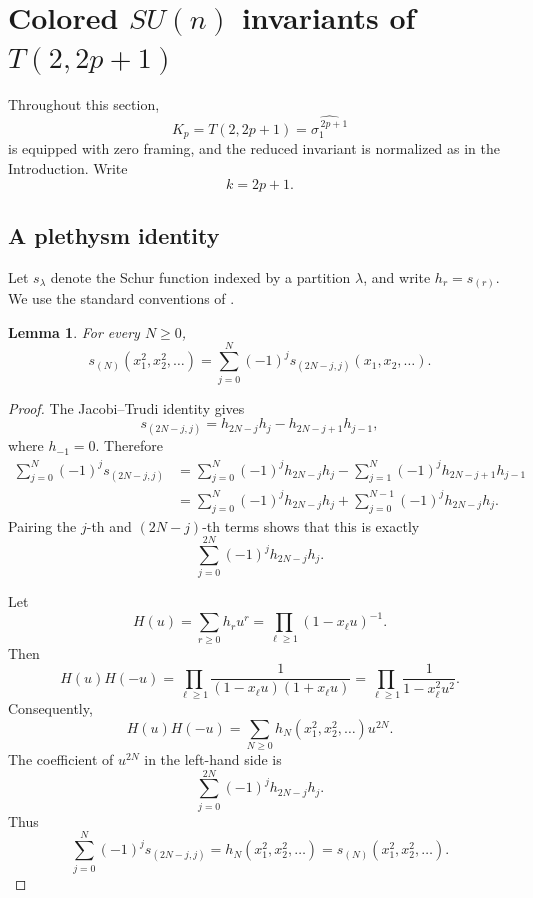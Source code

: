 \documentclass[11pt]{amsart}
\newtheorem{lemma}[theorem]{Lemma}
\begin{document}
\section{Colored \(SU(n)\) invariants of \(T(2,2p+1)\)}
\label{sec:torus}


Throughout this section,
\[
K_p=T(2,2p+1)=\widehat{\sigma_1^{\,2p+1}}
\]
is equipped with zero framing, and the reduced invariant is normalized
as in the Introduction.  Write
\[
k=2p+1.
\]

\subsection{A plethysm identity}


Let \(s_\lambda\) denote the Schur function indexed by a partition \(\lambda\), and write \(h_r=s_{(r)}\).
We use the standard conventions of \cite{Macdonald}.

\begin{lemma}\label{lem:plethysm}
For every \(N\geq0\),
\begin{equation}\label{eq:plethysm}
s_{(N)}(x_1^2,x_2^2,\ldots)
=
\sum_{j=0}^{N}
(-1)^j
s_{(2N-j,j)}(x_1,x_2,\ldots).
\end{equation}
\end{lemma}

\begin{proof}
The Jacobi--Trudi identity gives
\[
s_{(2N-j,j)}
=
h_{2N-j}h_j-h_{2N-j+1}h_{j-1},
\]
where \(h_{-1}=0\).
Therefore
\begin{align*}
\sum_{j=0}^{N}(-1)^j s_{(2N-j,j)}
&=
\sum_{j=0}^{N}
(-1)^j h_{2N-j}h_j
-
\sum_{j=1}^{N}
(-1)^j h_{2N-j+1}h_{j-1}
\\
&=
\sum_{j=0}^{N}
(-1)^j h_{2N-j}h_j
+
\sum_{j=0}^{N-1}
(-1)^j h_{2N-j}h_j.
\end{align*}
Pairing the \(j\)-th and
\((2N-j)\)-th terms shows that this is exactly
\[
\sum_{j=0}^{2N}
(-1)^j h_{2N-j}h_j.
\]

Let
\[
H(u)=\sum_{r\geq0}h_r u^r
=
\prod_{\ell\geq1}(1-x_\ell u)^{-1}.
\]
Then
\[
H(u)H(-u)
=
\prod_{\ell\geq1}
\frac{1}{(1-x_\ell u)(1+x_\ell u)}
=
\prod_{\ell\geq1}
\frac{1}{1-x_\ell^2u^2}.
\]
Consequently,
\[
H(u)H(-u)
=
\sum_{N\geq0}
h_N(x_1^2,x_2^2,\ldots)u^{2N}.
\]
The coefficient of \(u^{2N}\) in the left-hand side is
\[
\sum_{j=0}^{2N}
(-1)^j h_{2N-j}h_j.
\]
Thus
\[
\sum_{j=0}^{N}
(-1)^j s_{(2N-j,j)}
=
h_N(x_1^2,x_2^2,\ldots)
=
s_{(N)}(x_1^2,x_2^2,\ldots).
\]
\end{proof}
\end{document}
